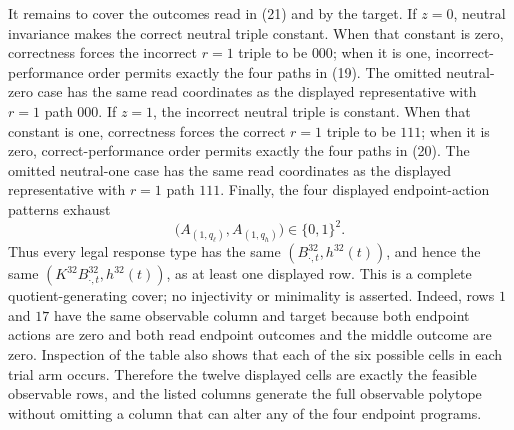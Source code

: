 It remains to cover the outcomes read in (21) and by the target.  If \(z=0\), neutral invariance makes the correct neutral triple constant.  When that constant is zero, correctness forces the incorrect \(r=1\) triple to be \(000\); when it is one, incorrect-performance order permits exactly the four paths in (19).  The omitted neutral-zero case has the same read coordinates as the displayed representative with \(r=1\) path \(000\).  If \(z=1\), the incorrect neutral triple is constant.  When that constant is one, correctness forces the correct \(r=1\) triple to be \(111\); when it is zero, correct-performance order permits exactly the four paths in (20).  The omitted neutral-one case has the same read coordinates as the displayed representative with \(r=1\) path \(111\).  Finally, the four displayed endpoint-action patterns exhaust
\[
\bigl(A_{(1,q_\ell)},A_{(1,q_h)}\bigr)\in\{0,1\}^2.
\tag{22}
\]
Thus every legal response type has the same \((B^{32}_{\cdot,t},h^{32}(t))\), and hence the same \((K^{32}B^{32}_{\cdot,t},h^{32}(t))\), as at least one displayed row.  This is a complete quotient-generating cover; no injectivity or minimality is asserted.  Indeed, rows \(1\) and \(17\) have the same observable column and target because both endpoint actions are zero and both read endpoint outcomes and the middle outcome are zero.  Inspection of the table also shows that each of the six possible cells in each trial arm occurs.  Therefore the twelve displayed cells are exactly the feasible observable rows, and the listed columns generate the full observable polytope without omitting a column that can alter any of the four endpoint programs.

